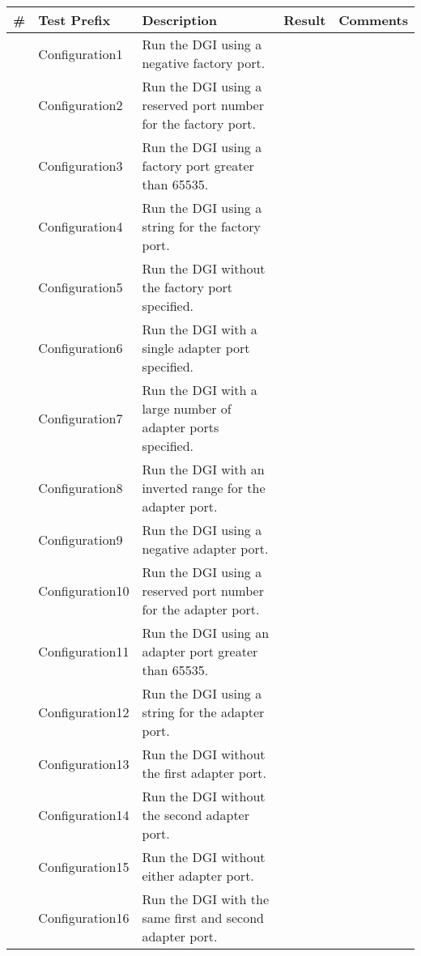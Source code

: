 \documentclass{article}
\newcommand{\pass}{\textcolor{OliveGreen}{PASS}}
\newcommand{\fail}{\textcolor{BrickRed}{FAIL}}
\newcounter{rownum}
\newcommand\rownumber{\stepcounter{rownum}\arabic{rownum}}
\begin{document}
\centering
\begin{longtable}{|c|p{4cm}|p{5cm}|c|p{6cm}|}
	\hline
	\# & Test Prefix & Description & Result & Comments \\ \hline \endhead \hline \endfoot
	\rownumber & Configuration1 & Run the DGI using a negative factory port.
						 & & \\
	\rownumber & Configuration2 & Run the DGI using a reserved port number for the factory port.
						 & & \\
	\rownumber & Configuration3 & Run the DGI using a factory port greater than 65535.
						 & & \\
	\rownumber & Configuration4 & Run the DGI using a string for the factory port.
						 & & \\
	\rownumber & Configuration5 & Run the DGI without the factory port specified.
						 & & \\
	\rownumber & Configuration6 & Run the DGI with a single adapter port specified.
						 & & \\
	\rownumber & Configuration7 & Run the DGI with a large number of adapter ports specified.
						 & & \\
	\rownumber & Configuration8 & Run the DGI with an inverted range for the adapter port.
						 & & \\
	\rownumber & Configuration9 & Run the DGI using a negative adapter port.
						 & & \\
	\rownumber & Configuration10 & Run the DGI using a reserved port number for the adapter port.
						 & & \\
	\rownumber & Configuration11 & Run the DGI using an adapter port greater than 65535.
						 & & \\
	\rownumber & Configuration12 & Run the DGI using a string for the adapter port.
						 & & \\
	\rownumber & Configuration13 & Run the DGI without the first adapter port.
						 & & \\
	\rownumber & Configuration14 & Run the DGI without the second adapter port.
						 & & \\
	\rownumber & Configuration15 & Run the DGI without either adapter port.
						 & & \\
	\rownumber & Configuration16 & Run the DGI with the same first and second adapter port.

\end{longtable}
\end{document}
